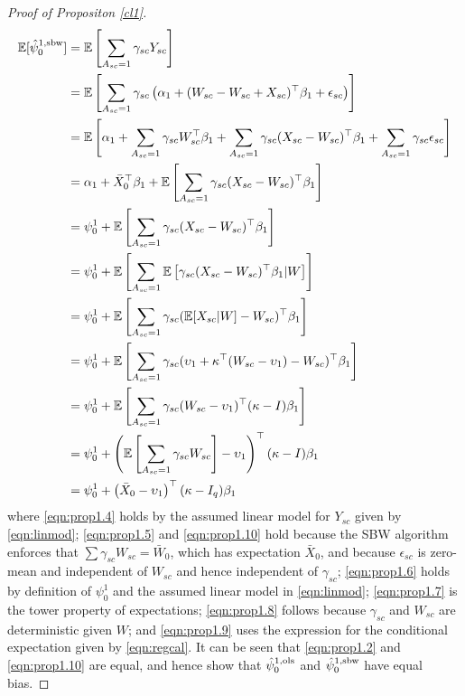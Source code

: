 \begin{proof}[Proof of Propositon \ref{cl1}]
\begin{align}
\nonumber	\mathbb{E}[\hat{\psi}_0^{1, \textup{sbw}}] & = \mathbb{E}\left[ \sum_{A_{sc} = 1} {\gamma}_{sc} Y_{sc}\right] \\
	& = \mathbb{E}\left[ \sum_{A_{sc}=1} {\gamma}_{sc} \left(\alpha_1 + (W_{sc} - W_{sc} + X_{sc})^\top \beta_1 + \epsilon_{sc}\right)\right] \label{eqn:prop1.4}\\
\nonumber	& = \mathbb{E}\left[ \alpha_1 + \sum_{A_{sc} = 1} {\gamma}_{sc} W_{sc}^\top \beta_1 + \sum_{A_{sc}=1} {\gamma}_{sc} (X_{sc} - W_{sc})^\top \beta_1 + \sum_{A_{sc}=1} {\gamma}_{sc} \epsilon_{sc} \right] \\
	& = \alpha_1 + \bar{X}_0^\top \beta_1 + \mathbb{E}\left[ \sum_{A_{sc} = 1} {\gamma}_{sc}(X_{sc} - W_{sc})^\top \beta_1\right] \label{eqn:prop1.5}\\
	& = \psi_0^1 + \mathbb{E} \left[ \sum_{A_{sc} = 1} {\gamma}_{sc}(X_{sc} - W_{sc})^\top \beta_1 \right] \label{eqn:prop1.6} \\
	& = \psi_0^1 + \mathbb{E} \left[ \sum_{A_{sc} = 1} \mathbb{E}\left[ {\gamma}_{sc}(X_{sc} - W_{sc})^\top \beta_1 | W \right] \right] \label{eqn:prop1.7} \\
	& = \psi_0^1 + \mathbb{E} \left[ \sum_{A_{sc} = 1}  {\gamma}_{sc} (\mathbb{E}[X_{sc}|W] - W_{sc})^\top \beta_1 \right] \label{eqn:prop1.8} \\
	& = \psi_0^1 + \mathbb{E} \left[ \sum_{A_{sc} = 1}  {\gamma}_{sc} (\upsilon_1 + \kappa^\top(W_{sc} - \upsilon_1) - W_{sc})^\top \beta_1 \right] \label{eqn:prop1.9} \\
\nonumber	& = \psi_0^1 + \mathbb{E} \left[ \sum_{A_{sc} = 1}  {\gamma}_{sc} (W_{sc} - \upsilon_1)^\top(\kappa - I)\beta_1 \right] \\
\nonumber	& = \psi_0^1 + \left(\mathbb{E}\left[\sum_{A_{sc} = 1} {\gamma}_{sc} W_{sc}\right] - \upsilon_1\right)^\top(\kappa - I)\beta_1  \\
	& = \psi_0^1 + \left(\bar{X}_0 - \upsilon_1\right)^\top(\kappa - I_q)\beta_1  \label{eqn:prop1.10}
\end{align}
%
where \eqref{eqn:prop1.4} holds by the assumed linear model for $Y_{sc}$ given by  \eqref{eqn:linmod}; \eqref{eqn:prop1.5} and \eqref{eqn:prop1.10} hold because the SBW algorithm enforces that $\sum \gamma_{sc} W_{sc} = \bar{W}_0$, which has expectation $\bar{X}_0$, and because $\epsilon_{sc}$ is zero-mean and independent of $W_{sc}$ and hence independent of $\gamma_{sc}$; \eqref{eqn:prop1.6} holds by definition of $\psi_0^1$ and the assumed linear model in \eqref{eqn:linmod}; \eqref{eqn:prop1.7} is the tower property of expectations; \eqref{eqn:prop1.8} follows because $\gamma_{sc}$ and $W_{sc}$ are deterministic given $W$; and \eqref{eqn:prop1.9} uses the expression for the conditional expectation given by \eqref{eqn:regcal}. It can be seen that \eqref{eqn:prop1.2} and \eqref{eqn:prop1.10} are equal, and hence show that $\hat{\psi}_0^{1,\textup{ols}}$ and $\hat{\psi}_0^{1, \textup{sbw}}$ have equal bias.


\end{proof}
